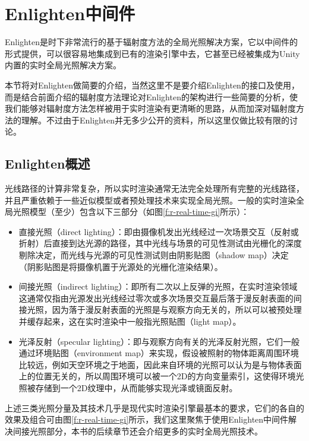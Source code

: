 \section{Enlighten中间件}\label{sec:r-enlighten}
Enlighten是时下非常流行的基于辐射度方法的全局光照解决方案，它以中间件的形式提供，可以很容易地集成到已有的渲染引擎中去，它甚至已经被集成为Unity内置的实时全局光照解决方案。

本节将对Enlighten做简要的介绍，当然这里不是要介绍Enlighten的接口及使用，而是结合前面介绍的辐射度方法理论对Enlighten的架构进行一些简要的分析，使我们能够对辐射度方法怎样被用于实时渲染有更清晰的思路，从而加深对辐射度方法的理解。不过由于Enlighten并无多少公开的资料，所以这里仅做比较有限的讨论。



\subsection{Enlighten概述}
光线路径的计算非常复杂，所以实时渲染通常无法完全处理所有完整的光线路径，并且严重依赖于一些近似模型或者预处理技术来实现全局光照。一般的实时渲染全局光照模型（至少）包含以下三部分（如图\ref{f:r-real-time-gi}所示）：

\begin{itemize}
	\item 直接光照（direct lighting）：即由摄像机发出光线经过一次场景交互（反射或折射）后直接到达光源的路径，其中光线与场景的可见性测试由光栅化的深度剔除决定，而光线与光源的可见性测试则由阴影贴图（shadow map）决定（阴影贴图是将摄像机置于光源处的光栅化渲染结果）。
	\item 间接光照（indirect lighting）：即所有二次以上反弹的光照，在实时渲染领域这通常仅指由光源发出光线经过零次或多次场景交互最后落于漫反射表面的间接光照，因为落于漫反射表面的光照是与观察方向无关的，所以可以被预处理并缓存起来，这在实时渲染中一般指光照贴图（light map）。
	\item 光泽反射（specular lighting）：即与观察方向有关的光泽反射光照，它们一般通过环境贴图（environment map）来实现，假设被照射的物体距离周围环境比较远，例如天空环境之于地面，因此来自环境的光照可以认为是与物体表面上的位置无关的，所以周围环境可以被一个2D的方向变量索引，这使得环境光照被存储到一个2D纹理中，从而能够实现光泽或镜面反射。
\end{itemize}

上述三类光照分量及其技术几乎是现代实时渲染引擎最基本的要求，它们的各自的效果及组合可由图\ref{f:r-real-time-gi}所示，我们这里聚焦于使用Enlighten中间件解决间接光照部分，本书的后续章节还会介绍更多的实时全局光照技术。

